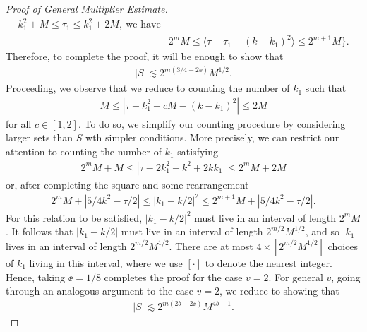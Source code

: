\begin{proof}[Proof of General Multiplier Estimate]
\begin{equation*}
\begin{split}
  k_{1}^{2} + M \le \tau_{1} \le k_{1}^{2} + 2M, \ \text{we have}
  \\
  & 2^{m} M \le \langle \tau - \tau_{1} - (k - k_{1})^{2} \rangle  \le 2^{m+1}M \}.
\end{split}
\end{equation*}
%
Therefore, to complete the proof, it will be enough to show that
%
%
\begin{equation*}
\begin{split}
  | S | \lesssim 2^{m(3/4 - 2 \ee)}M^{1/2}.
\end{split}
\end{equation*}
%
Proceeding, we observe that we reduce to counting the number of $k_{1}$ such that
%
%
%
\begin{equation*}
\begin{split}
  M \le | \tau - k_{1}^{2} - cM  - (k - k_{1})^{2}| \le 2M
\end{split}
\end{equation*}
%
for all $c \in [1,2]$.
To do so, we simplify our counting procedure by considering larger sets than $S$ wth simpler conditions. More precisely, we can restrict our attention to counting the number of $k_{1}$ satisfying
%
%
\begin{equation*}
\begin{split}
  2^{m}M + M \le | \tau - 2k_{1}^{2} - k^{2} + 2kk_{1} | \le 2^{m}M + 2M
\end{split}
\end{equation*}
%
%
or, after completing the square and some rearrangement
%
%
\begin{equation}
\begin{split}
  2^{m}M + | 5/4 k^{2} - \tau/2 | \le | k_{1} - k/2 |^{2} \le 2^{m+1}M + | 5/4 k^{2} - \tau/2 |.
\end{split}
\end{equation}
%
%
For this relation to be satisfied, $| k_{1} - k/2 |^{2}$ must live in an interval of length $2^{m}M$. It follows that $| k_{1} - k/2 |$ must live in an interval of length $2^{m/2} M^{1/2}$, and so $|k_{1}|$ lives in an interval  of length $2^{m/2} M^{1/2}$. There are at most $4 \times [2^{m/2} M^{1/2}]$ choices of $k_{1}$ living in this interval, where we use $[\cdot]$ to denote the nearest integer. Hence, taking $\ee = 1/8$ completes the proof for the case $v=2$. For general $v$, going through an analogous argument to the case $v=2$, we reduce to showing that
\begin{equation*}
\begin{split}
  | S | \lesssim 2^{m(2b - 2 \ee)}M^{4b -1}.

\end{split}
\end{equation*}
\end{proof}
